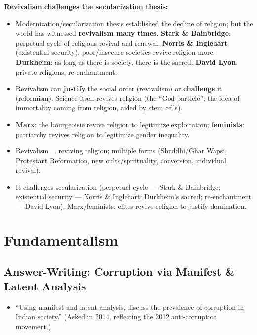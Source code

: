 \begin{CriticalPoint}
\textbf{Revivalism challenges the secularization thesis:}
\begin{itemize}
\item Modernization/secularization thesis established the decline of religion; but the world has witnessed \textbf{revivalism many times}. \textbf{Stark \& Bainbridge}: perpetual cycle of religious revival and renewal. \textbf{Norris \& Inglehart} (existential security): poor/insecure societies revive religion more. \textbf{Durkheim}: as long as there is society, there is the sacred. \textbf{David Lyon}: private religions, re-enchantment.
\item Revivalism can \textbf{justify} the social order (revivalism) or \textbf{challenge} it (reformism). Science itself revives religion (the ``God particle''; the idea of immortality coming from religion, aided by stem cells).
\item \textbf{Marx}: the bourgeoisie revive religion to legitimize exploitation; \textbf{feminists}: patriarchy revives religion to legitimize gender inequality.
\end{itemize}
\end{CriticalPoint}

\begin{QuickRevision}
\begin{itemize}
\item Revivalism = reviving religion; multiple forms (Shuddhi/Ghar Wapsi, Protestant Reformation, new cults/spirituality, conversion, individual revival).
\item It challenges secularization (perpetual cycle --- Stark \& Bainbridge; existential security --- Norris \& Inglehart; Durkheim's sacred; re-enchantment --- David Lyon). Marx/feminists: elites revive religion to justify domination.
\end{itemize}
\end{QuickRevision}

\sectiondivider

\section{Fundamentalism}

\subsection{Answer-Writing: Corruption via Manifest \& Latent Analysis}

\begin{PYQLink}
\begin{itemize}
\item ``Using manifest and latent analysis, discuss the prevalence of corruption in Indian society.'' (Asked in 2014, reflecting the 2012 anti-corruption movement.)
\end{itemize}
\end{PYQLink}

